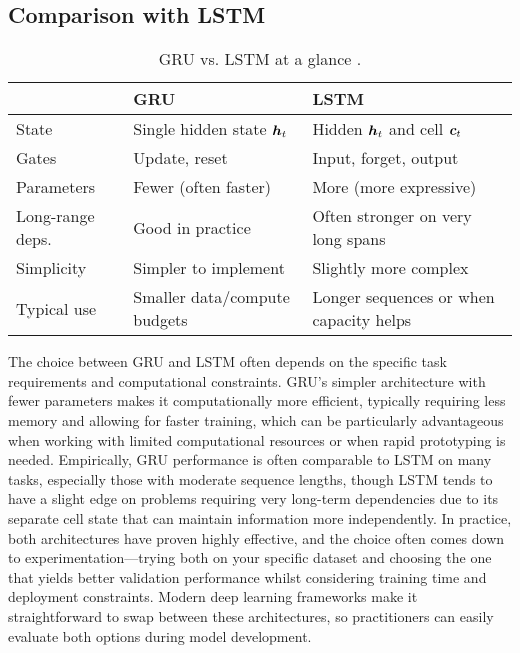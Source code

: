\subsection{Comparison with LSTM}
\begin{table}[h]
    \centering
    \begin{tabular}{@{}p{3.2cm}p{5.2cm}p{5.2cm}@{}}
    \toprule
    & \textbf{GRU} & \textbf{LSTM} \\
    \midrule
    State & Single hidden state $\boldsymbol{h}_t$ & Hidden $\boldsymbol{h}_t$ and cell $\boldsymbol{c}_t$ \\
    Gates & Update, reset & Input, forget, output \\
    Parameters & Fewer (often faster) & More (more expressive) \\
    Long-range deps. & Good in practice & Often stronger on very long spans \\
    Simplicity & Simpler to implement & Slightly more complex \\
    Typical use & Smaller data/compute budgets & Longer sequences or when capacity helps \\
    \bottomrule
    \end{tabular}
    \caption{GRU vs. LSTM at a glance \cite{Cho2014,Hochreiter1997,GoodfellowEtAl2016}.}
\end{table}

The choice between GRU and LSTM often depends on the specific task requirements and computational constraints. GRU's simpler architecture with fewer parameters makes it computationally more efficient, typically requiring less memory and allowing for faster training, which can be particularly advantageous when working with limited computational resources or when rapid prototyping is needed. Empirically, GRU performance is often comparable to LSTM on many tasks, especially those with moderate sequence lengths, though LSTM tends to have a slight edge on problems requiring very long-term dependencies due to its separate cell state that can maintain information more independently. In practice, both architectures have proven highly effective, and the choice often comes down to experimentation—trying both on your specific dataset and choosing the one that yields better validation performance whilst considering training time and deployment constraints. Modern deep learning frameworks make it straightforward to swap between these architectures, so practitioners can easily evaluate both options during model development.

